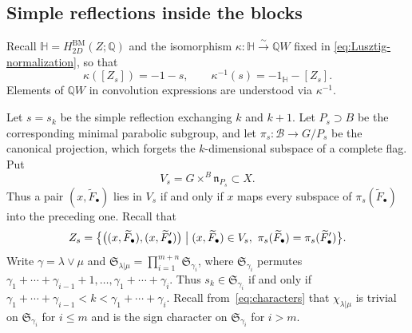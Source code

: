 \documentclass[11pt,a4paper]{amsart}
\theoremstyle{definition}
\theoremstyle{remark}
\newcommand{\Q}{\mathbb Q}
\newcommand{\B}{\mathcal B}
\newcommand{\bH}{\mathbb H}
\newcommand{\BM}{\mathrm{BM}}
\newcommand{\lm}{\lambda|\mu}
\numberwithin{equation}{section}
\begin{document}
\subsection{Simple reflections inside the blocks}
\label{sec:reflection}

Recall $\bH=H^{\BM}_{2D}(Z;\Q)$ and the isomorphism
$\kappa:\bH\xrightarrow{\sim}\Q W$ fixed in
\eqref{eq:Lusztig-normalization}, so that
\begin{equation}\label{eq:raw-simple}
\kappa([Z_s])=-1-s,\qquad \kappa^{-1}(s)=-1_{\bH}-[Z_s].
\end{equation}
Elements of $\Q W$ in convolution expressions are understood via
$\kappa^{-1}$.

Let $s=s_k$ be the simple reflection exchanging $k$ and $k+1$. Let
$P_s\supset B$ be the corresponding minimal parabolic subgroup, and let
$\pi_s:\B\to G/P_s$ be the canonical projection, which forgets the
$k$-dimensional subspace of a complete flag. Put
$$
V_s=G\times^B\mathfrak n_{P_s}\subset X .
$$
Thus a pair $(x,\widetilde F_\bullet)$ lies in $V_s$ if and only if $x$
maps every subspace of $\pi_s(\widetilde F_\bullet)$ into the preceding
one. Recall that
$$
Z_s=\bigl\{\bigl((x,\widetilde F_\bullet),(x,\widetilde F'_\bullet)\bigr)
\bigm|(x,\widetilde F_\bullet)\in V_s,\
\pi_s(\widetilde F_\bullet)=\pi_s(\widetilde F'_\bullet)\bigr\}.
$$
Write $\gamma=\lambda\vee\mu$ and
$\mathfrak S_{\lm}=\prod_{i=1}^{m+n}\mathfrak S_{\gamma_i}$, where
$\mathfrak S_{\gamma_i}$ permutes
$\gamma_1+\cdots+\gamma_{i-1}+1,\ldots,\gamma_1+\cdots+\gamma_i$. Thus
$s_k\in\mathfrak S_{\gamma_i}$ if and only if
$\gamma_1+\cdots+\gamma_{i-1}<k<\gamma_1+\cdots+\gamma_i$. Recall
from~\eqref{eq:characters} that $\chi_{\lm}$ is trivial on
$\mathfrak S_{\gamma_i}$ for $i\le m$ and is the sign character on
$\mathfrak S_{\gamma_i}$ for $i>m$.
\end{document}

